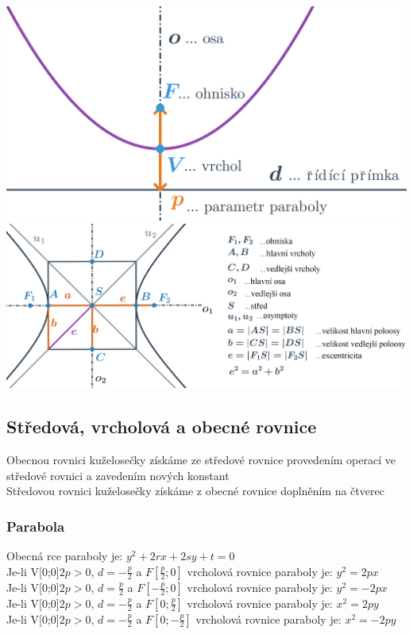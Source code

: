     \includegraphics[width=0.45\linewidth]{img/14_parabola1.png} \includegraphics[width=0.7\linewidth]{img/14_hyperbola1.png}
\subsection {Středová, vrcholová a obecné rovnice}
    Obecnou rovnici kuželosečky získáme ze středové rovnice provedením operací ve středové rovnici a zavedením nových konstant\\
    Středovou rovnici kuželosečky získáme z obecné rovnice doplněním na čtverec
\subsubsection{Parabola}
    Obecná rce paraboly je: $y^2 + 2rx +2sy+t=0$ \\ 
 
    Je-li V[0;0]$2p>0$, $d= -\frac{p}{2}$ a $F[\frac{p}{2};0]$ vrcholová rovnice paraboly je: $y^2=2px$ \\
    Je-li V[0;0]$2p>0$, $d= \frac{p}{2}$ a $F[-\frac{p}{2};0]$ vrcholová rovnice paraboly je: $y^2=-2px$ \\
    Je-li V[0;0]$2p>0$, $d= -\frac{p}{2}$ a $F[0;\frac{p}{2}]$ vrcholová rovnice paraboly je: $x^2=2py$ \\
    Je-li V[0;0]$2p>0$, $d= -\frac{p}{2}$ a $F[0;-\frac{p}{2}]$ vrcholová rovnice paraboly je: $x^2=-2py$ \\

